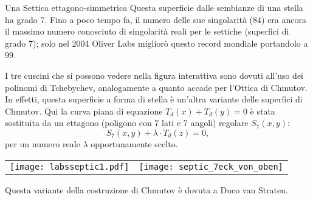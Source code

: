 \begin{surferPage}[Ettagono]{Una Settica ettagono-simmetrica}
    Questa superficie dalle sembianze di una stella ha grado $7$. Fino a poco tempo fa, il numero delle sue singolarit\`a ($84$) era ancora il massimo numero conosciuto di singolarit\`a reali per le settiche (superfici di grado $7$); solo nel 2004 Oliver Labs miglior\`o questo record mondiale portandolo a $99$.
      
    I tre cuscini che si possono vedere nella figura interattiva sono dovuti all'uso dei polinomi di Tchebychev, analogamente a quanto accade per l'Ottica di Chmutov. 
    In effetti, questa superficie a forma di stella \`e un'altra variante delle superfici di Chmutov.
    Qui la curva piana di equazione $T_d(x)+T_d(y)=0$ \`e stata sostituita da un ettagono (poligono con $7$ lati e $7$ angoli) regolare $S_7(x,y)$: 
   \[S_7(x,y) + \lambda \cdot T_d(z) = 0,\]
    per un numero reale $\lambda$ opportunamente scelto. 
    \vspace*{-0.3em}
    \begin{center}
      \begin{tabular}{c@{\qquad}c}
        \texttt{[image: labsseptic1.pdf]}
        &
        \texttt{[image: septic\_7eck\_von\_oben]}
      \end{tabular}
    \end{center}
    \vspace*{-0.3em}   
   Questa variante della costruzione di Chmutov \`e dovuta a Duco van Straten.
\end{surferPage}
